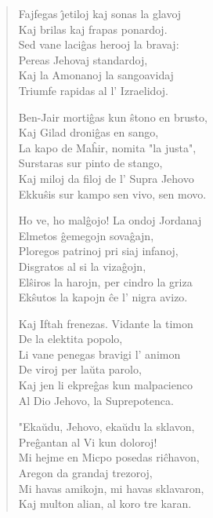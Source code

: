 \begin{verse}
                  Fajfegas \^{\j}etiloj kaj sonas la glavoj\\
                   \vin     Kaj brilas kaj frapas ponardoj.\\
                  Sed vane laci\^gas herooj la bravaj:\\
                    \vin    Pereas Jehovaj standardoj,\\
                  Kaj la Amonanoj la sangoavidaj\\
                  Triumfe rapidas al l' Izraelidoj.

                  Ben-Jair morti\^gas kun \^stono en brusto,\\
                    \vin    Kaj Gilad droni\^gas en sango,\\
                  La kapo de Ma\^hir, nomita "la justa",\\
                   \vin     Surstaras sur pinto de stango,\\
                  Kaj miloj da filoj de l' Supra Jehovo\\
                  Ekku\^sis sur kampo sen vivo, sen movo.

                  Ho ve, ho mal\^gojo! La ondoj Jordanaj\\
                    \vin    Elmetos \^gemegojn sova\^gajn,\\
                  Ploregos patrinoj pri siaj infanoj,\\
                    \vin    Disgratos al si la viza\^gojn,\\
                  El\^siros la harojn, per cindro la griza\\
                  Ek\^sutos la kapojn \^ce l' nigra avizo.

                  Kaj Iftah frenezas. Vidante la timon\\
                    \vin    De la elektita popolo,\\
                  Li vane penegas bravigi l' animon\\
                    \vin    De viroj per la\u uta parolo,\\
                  Kaj jen li ekpre\^gas kun malpacienco\\
                  Al Dio Jehovo, la Suprepotenca.

                  "Eka\u udu, Jehovo, eka\u udu la sklavon,\\
                      \vin  Pre\^gantan al Vi kun doloroj!\\
                  Mi hejme en Micpo posedas ri\^chavon,\\
                    \vin    Aregon da grandaj trezoroj,\\
                  Mi havas amikojn, mi havas sklavaron,\\
                  Kaj multon alian, al koro tre karan.


\end{verse}
